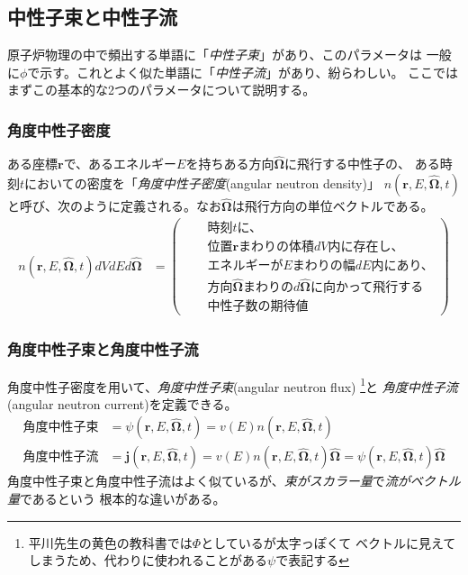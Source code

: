
\subsection{中性子束と中性子流}
原子炉物理の中で頻出する単語に「\emph{中性子束}」があり、このパラメータは
一般に$\phi$で示す。これとよく似た単語に「\emph{中性子流}」があり、紛らわしい。
ここではまずこの基本的な2つのパラメータについて説明する。

\subsubsection{角度中性子密度}
\newcommand{\SpcAng}{\mathbf{\hat{\Omega}}} %
\newcommand{\rEOt}{\mathbf{r}, E, \SpcAng, t} %
ある座標$\mathbf{r}$で、あるエネルギー$E$を持ちある方向$\SpcAng$に飛行する中性子の、
ある時刻$t$においての密度を「\emph{角度中性子密度}(angular neutron density)」
$n(\rEOt)$と呼び、次のように定義される。なお$\SpcAng$は飛行方向の単位ベクトルである。
\begin{align}
  n(\rEOt) dVdEd\SpcAng &= 
  \left(
  \begin{aligned}
    &\quad\text{時刻$t$に、} \\
    &\quad\text{位置$\mathbf{r}$まわりの体積$dV$内に存在し、}\\
    &\quad\text{エネルギーが$E$まわりの幅$dE$内にあり、} \\
    &\quad\text{方向$\SpcAng$まわりの$d\SpcAng$に向かって飛行する}\\
    &\quad\text{中性子数の期待値}
  \end{aligned}
  \right)
  \label{AngDens}
\end{align}

\subsubsection{角度中性子束と角度中性子流}
角度中性子密度を用いて、\emph{角度中性子束}(angular neutron flux)
\footnote{平川先生の黄色の教科書では$\Phi$としているが太字っぽくて
ベクトルに見えてしまうため、代わりに使われることがある$\psi$で表記する}と
\emph{角度中性子流}(angular neutron current)を定義できる。
\begin{align}
  \text{角度中性子束} &= \psi(\rEOt) = v(E) n(\rEOt) \label{AngFlux}\\
  \text{角度中性子流} &= \mathbf{j}(\rEOt) = v(E) n(\rEOt) \SpcAng = \psi(\rEOt) \SpcAng \label{AngCrnt}
\end{align}
角度中性子束と角度中性子流はよく似ているが、\emph{束がスカラー量}で\emph{流がベクトル量}であるという
根本的な違いがある。

